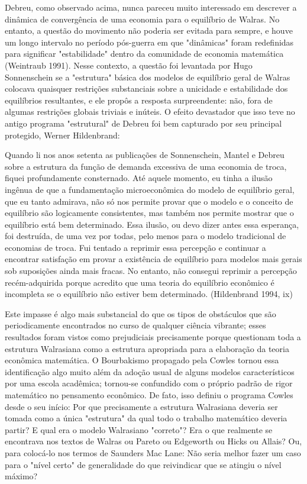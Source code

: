 \documentclass[a4paper,12pt]{article}[abntex2]
\begin{document}
Debreu, como observado acima, nunca pareceu muito interessado em descrever a dinâmica de convergência de uma economia para o equilíbrio de Walras. No entanto, a questão do movimento não poderia ser evitada para sempre, e houve um longo intervalo no período pós-guerra em que "dinâmicas" foram redefinidas para significar "estabilidade" dentro da comunidade de economia matemática (Weintraub 1991). Nesse contexto, a questão foi levantada por Hugo Sonnenschein se a "estrutura" básica dos modelos de equilíbrio geral de Walras colocava quaisquer restrições substanciais sobre a unicidade e estabilidade dos equilíbrios resultantes, e ele propôs a resposta surpreendente: não, fora de algumas restrições globais triviais e inúteis. O efeito devastador que isso teve no antigo programa "estrutural" de Debreu foi bem capturado por seu principal protegido, Werner Hildenbrand:

Quando li nos anos setenta as publicações de Sonnenschein, Mantel e Debreu sobre a estrutura da função de demanda excessiva de uma economia de troca, fiquei profundamente consternado. Até aquele momento, eu tinha a ilusão ingênua de que a fundamentação microeconômica do modelo de equilíbrio geral, que eu tanto admirava, não só nos permite provar que o modelo e o conceito de equilíbrio são logicamente consistentes, mas também nos permite mostrar que o equilíbrio está bem determinado. Essa ilusão, ou devo dizer antes essa esperança, foi destruída, de uma vez por todas, pelo menos para o modelo tradicional de economias de troca. Fui tentado a reprimir essa percepção e continuar a encontrar satisfação em provar a existência de equilíbrio para modelos mais gerais sob suposições ainda mais fracas. No entanto, não consegui reprimir a percepção recém-adquirida porque acredito que uma teoria do equilíbrio econômico é incompleta se o equilíbrio não estiver bem determinado. (Hildenbrand 1994, ix)

Este impasse é algo mais substancial do que os tipos de obstáculos que são periodicamente encontrados no curso de qualquer ciência vibrante; esses resultados foram vistos como prejudiciais precisamente porque questionam toda a estrutura Walrasiana como a estrutura apropriada para a elaboração da teoria econômica matemática. O Bourbakismo propagado pela Cowles tornou essa identificação algo muito além da adoção usual de alguns modelos característicos por uma escola acadêmica; tornou-se confundido com o próprio padrão de rigor matemático no pensamento econômico. De fato, isso definiu o programa Cowles desde o seu início: Por que precisamente a estrutura Walrasiana deveria ser tomada como a única "estrutura" da qual todo o trabalho matemático deveria partir? E qual era o modelo Walrasiano "correto"? Era o que realmente se encontrava nos textos de Walras ou Pareto ou Edgeworth ou Hicks ou Allais? Ou, para colocá-lo nos termos de Saunders Mac Lane: Não seria melhor fazer um caso para o "nível certo" de generalidade do que reivindicar que se atingiu o nível máximo?
\end{document}
